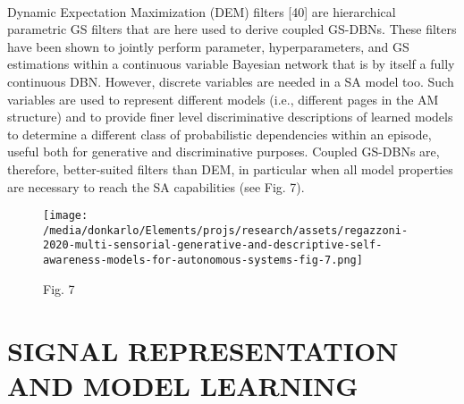 \documentclass{article}
\begin{document}
		\paragraph{} Dynamic Expectation Maximization (DEM) filters [40] are
		hierarchical parametric GS filters that are here used to
		derive coupled GS-DBNs. These filters have been shown to
		jointly perform parameter, hyperparameters, and GS estimations within a continuous variable Bayesian network that is
		by itself a fully continuous DBN. However, discrete variables
		are needed in a SA model too. Such variables are used to
		represent different models (i.e., different pages in the AM
		structure) and to provide finer level discriminative descriptions
		of learned models to determine a different class of probabilistic
		dependencies within an episode, useful both for generative
		and discriminative purposes. Coupled GS-DBNs are, therefore,
		better-suited filters than DEM, in particular when all model
		properties are necessary to reach the SA capabilities (see
		Fig. 7).
		\begin{figure*}
			\centering
			\texttt{[image: /media/donkarlo/Elements/projs/research/assets/regazzoni-2020-multi-sensorial-generative-and-descriptive-self-awareness-models-for-autonomous-systems-fig-7.png]}
			\caption{\cite{regazzoni-2020-multi-sensorial-generative-and-descriptive-self-awareness-models-for-autonomous-systems}Fig. 7}
			\label{fig:regazzoni-2020-multi-sensorial-generative-and-descriptive-self-awareness-models-for-autonomous-systems-fig-7.png}
		\end{figure*}
	
	\section{ SIGNAL REPRESENTATION AND MODEL LEARNING}
\end{document}
